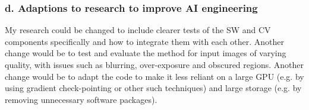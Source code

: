 \documentclass[11pt]{article}
\begin{document}
\subsubsection*{d. Adaptions to research to improve AI engineering}
My research could be changed to include clearer tests of the SW and CV components specifically and how to integrate them with each other. Another change would be to test and evaluate the method for input images of varying quality, with issues such as blurring, over-exposure and obscured regions. Another change would be to adapt the code to make it less reliant on a large GPU (e.g. by using gradient check-pointing or other such techniques) and large storage (e.g. by removing unnecessary software packages). 
\end{document}
